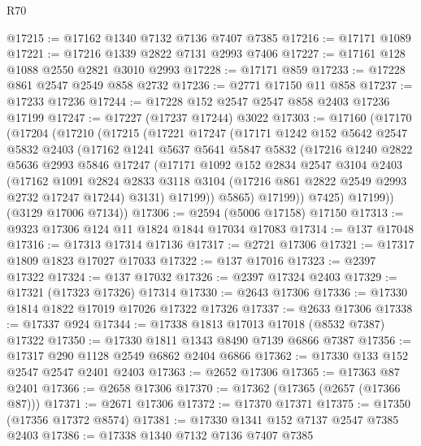\begin{lexlean}{R70}
\begin{coremodule}
@17215 := @17162 @1340 @7132 @7136 @7407 @7385
@17216 := @17171 @1089
@17221 := @17216 @1339 @2822 @7131 @2993 @7406
@17227 := @17161 @128 @1088 @2550 @2821 @3010 @2993
@17228 := @17171 @859
@17233 := @17228 @861 @2547 @2549 @858 @2732
@17236 := @2771 @17150 @11 @858
@17237 := @17233 @17236
@17244 := @17228 @152 @2547 @2547 @858 @2403 @17236 @17199
@17247 := @17227 (@17237 @17244) @3022
@17303 := @17160
    (@17170
      (@17204
        (@17210
          (@17215
            (@17221
              @17247
              (@17171
                @1242
                @152
                @5642
                @2547
                @5832
                @2403
                (@17162
                  @1241
                  @5637
                  @5641
                  @5847
                  @5832
                  (@17216
                    @1240
                    @2822
                    @5636
                    @2993
                    @5846
                    @17247
                    (@17171
                      @1092
                      @152
                      @2834
                      @2547
                      @3104
                      @2403
                      (@17162
                        @1091
                        @2824
                        @2833
                        @3118
                        @3104
                        (@17216 @861 @2822 @2549 @2993 @2732 @17247 @17244)
                        @3131)
                      @17199))
                  @5865)
                @17199))
            @7425)
          @17199))
      (@3129 @17006 @7134))
@17306 := @2594 (@5006 @17158) @17150
@17313 := @9323 @17306 @124 @11 @1824 @1844 @17034 @17083
@17314 := @137 @17048
@17316 := @17313 @17314 @17136
@17317 := @2721 @17306
@17321 := @17317 @1809 @1823 @17027 @17033
@17322 := @137 @17016
@17323 := @2397 @17322
@17324 := @137 @17032
@17326 := @2397 @17324 @2403
@17329 := @17321 (@17323 @17326) @17314
@17330 := @2643 @17306
@17336 := @17330 @1814 @1822 @17019 @17026 @17322 @17326
@17337 := @2633 @17306
@17338 := @17337 @924
@17344 := @17338 @1813 @17013 @17018 (@8532 @7387) @17322
@17350 := @17330 @1811 @1343 @8490 @7139 @6866 @7387
@17356 := @17317 @290 @1128 @2549 @6862 @2404 @6866
@17362 := @17330 @133 @152 @2547 @2547 @2401 @2403
@17363 := @2652 @17306
@17365 := @17363 @87 @2401
@17366 := @2658 @17306
@17370 := @17362 (@17365 (@2657 (@17366 @87)))
@17371 := @2671 @17306
@17372 := @17370 @17371
@17375 := @17350 (@17356 @17372 @8574)
@17381 := @17330 @1341 @152 @7137 @2547 @7385 @2403
@17386 := @17338 @1340 @7132 @7136 @7407 @7385

\end{coremodule}
\end{lexlean}
